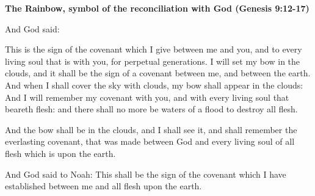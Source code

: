 \textbf{The Rainbow, symbol of the reconciliation with God (Genesis 9:12-17)}

And God said:

This is the sign of the covenant which I give between me and you, and to every living soul that is with you, for perpetual generations. I will set my bow in the clouds, and it shall be the sign of a covenant between me, and between the earth. And when I shall cover the sky with clouds, my bow shall appear in the clouds: And I will remember my covenant with you, and with every living soul that beareth flesh: and there shall no more be waters of a flood to destroy all flesh.

And the bow shall be in the clouds, and I shall see it, and shall remember the everlasting covenant, that was made between God and every living soul of all flesh which is upon the earth.

And God said to Noah: This shall be the sign of the covenant which I have established between me and all flesh upon the earth.

